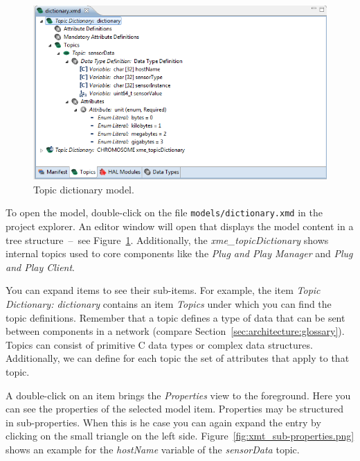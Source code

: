 \begin{figure}[htpb]
	\centering
	\includegraphics[scale=0.5]{figures/xmt_topicDictionary.png}
	\caption{Topic dictionary model.}
	\label{fig:xmt_topicDictionary.png}
\end{figure}

To open the model, double-click on the file \verb|models/dictionary.xmd| in the project explorer.
An editor window will open that displays the model content in a tree structure~--~see Figure~\ref{fig:xmt_topicDictionary.png}.
Additionally, the \xme \textit{xme\_topicDictionary} shows internal topics used to \xme core components like the \textit{Plug and Play Manager} and \textit{Plug and Play Client}.

You can expand items to see their sub-items.
For example, the item \emph{Topic Dictionary: dictionary} contains an item \emph{Topics} under which you can find the topic definitions.
Remember that a topic defines a type of data that can be sent between components in a \xme network (compare Section~\ref{sec:architecture:glossary}).
Topics can consist of primitive C data types or complex data structures. Additionally, we can define for each topic the set of attributes that apply to that topic. 

A double-click on an item brings the \emph{Properties} view to the foreground.
Here you can see the properties of the selected model item.
Properties may be structured in sub-properties.
When this is he case you can again expand the entry by clicking on the small triangle on the left side.
Figure~\ref{fig:xmt_sub-properties.png} shows an example for the \emph{hostName} variable of the \emph{sensorData} topic.

